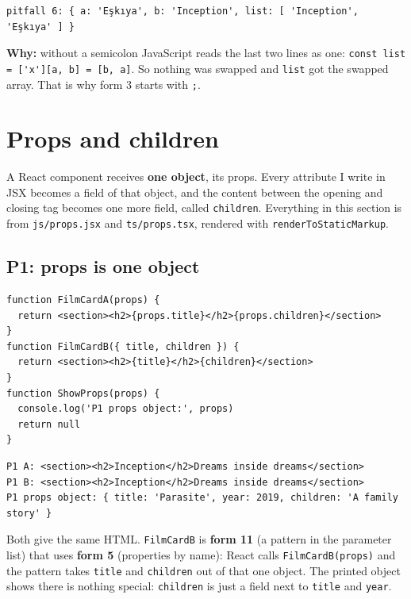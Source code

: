\documentclass[
]{article}
\newcommand{\passthrough}[1]{#1}
\begin{document}
\begin{lstlisting}
pitfall 6: { a: 'Eşkıya', b: 'Inception', list: [ 'Inception', 'Eşkıya' ] }
\end{lstlisting}

\textbf{Why:} without a semicolon JavaScript reads the last two lines as
one: \passthrough{\lstinline!const list = ['x'][a, b] = [b, a]!}. So
nothing was swapped and \passthrough{\lstinline!list!} got the swapped
array. That is why form 3 starts with \passthrough{\lstinline!;!}.

\hypertarget{props-and-children}{%
\section{Props and children}\label{props-and-children}}

A React component receives \textbf{one object}, its props. Every
attribute I write in JSX becomes a field of that object, and the content
between the opening and closing tag becomes one more field, called
\passthrough{\lstinline!children!}. Everything in this section is from
\passthrough{\lstinline!js/props.jsx!} and
\passthrough{\lstinline!ts/props.tsx!}, rendered with
\passthrough{\lstinline!renderToStaticMarkup!}.

\hypertarget{p1-props-is-one-object}{%
\subsection{P1: props is one object}\label{p1-props-is-one-object}}

\begin{lstlisting}
function FilmCardA(props) {
  return <section><h2>{props.title}</h2>{props.children}</section>
}
function FilmCardB({ title, children }) {
  return <section><h2>{title}</h2>{children}</section>
}
function ShowProps(props) {
  console.log('P1 props object:', props)
  return null
}
\end{lstlisting}

\begin{lstlisting}
P1 A: <section><h2>Inception</h2>Dreams inside dreams</section>
P1 B: <section><h2>Inception</h2>Dreams inside dreams</section>
P1 props object: { title: 'Parasite', year: 2019, children: 'A family story' }
\end{lstlisting}

Both give the same HTML. \passthrough{\lstinline!FilmCardB!} is
\textbf{form 11} (a pattern in the parameter list) that uses
\textbf{form 5} (properties by name): React calls
\passthrough{\lstinline!FilmCardB(props)!} and the pattern takes
\passthrough{\lstinline!title!} and \passthrough{\lstinline!children!}
out of that one object. The printed object shows there is nothing
special: \passthrough{\lstinline!children!} is just a field next to
\passthrough{\lstinline!title!} and \passthrough{\lstinline!year!}.
\end{document}
